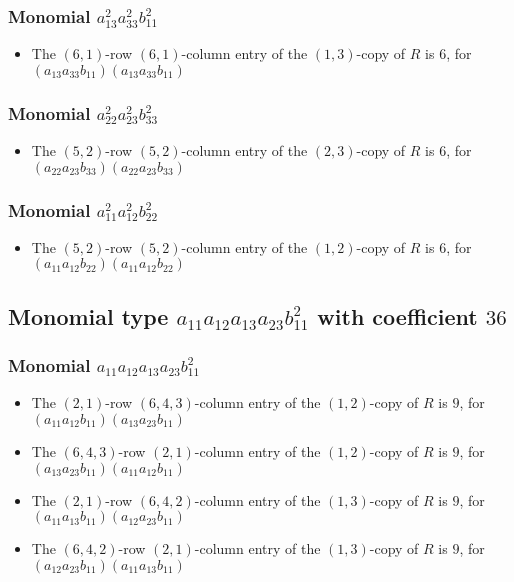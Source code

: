 \documentclass{article}
\begin{document}
\subsubsection{Monomial $ a_{13}^{2} a_{33}^{2} b_{11}^{2} $}

\begin{itemize}
\item The $(6, 1)$-row $(6, 1)$-column entry of the $ \left(1, 3\right) $-copy of $R$ is $ 6 $, for $( a_{13} a_{33} b_{11} )( a_{13} a_{33} b_{11} )$ 
\end{itemize}
\subsubsection{Monomial $ a_{22}^{2} a_{23}^{2} b_{33}^{2} $}

\begin{itemize}
\item The $(5, 2)$-row $(5, 2)$-column entry of the $ \left(2, 3\right) $-copy of $R$ is $ 6 $, for $( a_{22} a_{23} b_{33} )( a_{22} a_{23} b_{33} )$ 
\end{itemize}
\subsubsection{Monomial $ a_{11}^{2} a_{12}^{2} b_{22}^{2} $}

\begin{itemize}
\item The $(5, 2)$-row $(5, 2)$-column entry of the $ \left(1, 2\right) $-copy of $R$ is $ 6 $, for $( a_{11} a_{12} b_{22} )( a_{11} a_{12} b_{22} )$ 
\end{itemize}
\subsection{Monomial type $ a_{11} a_{12} a_{13} a_{23} b_{11}^{2} $ with coefficient $ 36 $}

\subsubsection{Monomial $ a_{11} a_{12} a_{13} a_{23} b_{11}^{2} $}

\begin{itemize}
\item The $(2, 1)$-row $(6, 4, 3)$-column entry of the $ \left(1, 2\right) $-copy of $R$ is $ 9 $, for $( a_{11} a_{12} b_{11} )( a_{13} a_{23} b_{11} )$ 
\item The $(6, 4, 3)$-row $(2, 1)$-column entry of the $ \left(1, 2\right) $-copy of $R$ is $ 9 $, for $( a_{13} a_{23} b_{11} )( a_{11} a_{12} b_{11} )$ 
\item The $(2, 1)$-row $(6, 4, 2)$-column entry of the $ \left(1, 3\right) $-copy of $R$ is $ 9 $, for $( a_{11} a_{13} b_{11} )( a_{12} a_{23} b_{11} )$ 
\item The $(6, 4, 2)$-row $(2, 1)$-column entry of the $ \left(1, 3\right) $-copy of $R$ is $ 9 $, for $( a_{12} a_{23} b_{11} )( a_{11} a_{13} b_{11} )$ 
\end{itemize}
\end{document}
